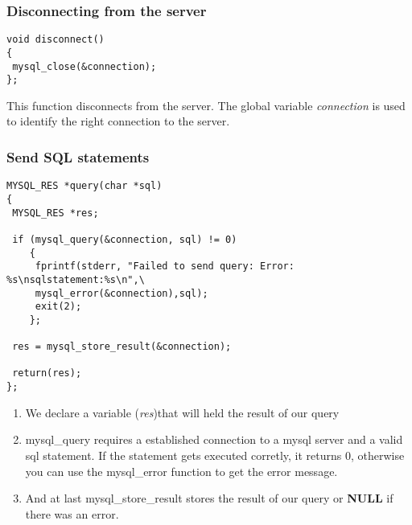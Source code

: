 \subsubsection{Disconnecting from the server}
\begin{verbatim}
void disconnect()
{
 mysql_close(&connection);
};
\end{verbatim}
This function disconnects from the server. The global variable \textit{connection} is used to identify the right connection to the server.





\subsubsection{Send SQL statements}
\begin{verbatim}
MYSQL_RES *query(char *sql)
{
 MYSQL_RES *res;

 if (mysql_query(&connection, sql) != 0)
    {
     fprintf(stderr, "Failed to send query: Error: %s\nsqlstatement:%s\n",\
     mysql_error(&connection),sql);
     exit(2);
    };

 res = mysql_store_result(&connection);

 return(res);
};
\end{verbatim}
\begin{enumerate}
\item We declare a variable (\textit{res})that will held the result of our query
\item mysql\_query requires a established connection to a mysql server and a valid sql statement. If the statement gets executed corretly, it returns 0, otherwise you can use the mysql\_error function to get the error message.
\item And at last mysql\_store\_result stores the result of our query or \textbf{NULL} if there was an error.
\end{enumerate}





